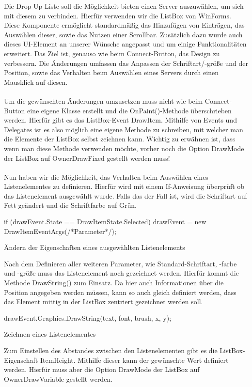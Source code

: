 Die Drop-Up-Liste soll die Möglichkeit bieten einen Server auszuwählen, um sich mit diesem zu verbinden. Hierfür verwenden wir die ListBox von WinForms. Diese Komponente ermöglicht standardmäßig das Hinzufügen von Einträgen, das Auswählen dieser, sowie das Nutzen einer Scrollbar. Zusätzlich dazu wurde auch dieses UI-Element an unserer Wünsche angepasst und um einige Funktionalitäten erweitert. Das Ziel ist, genauso wie beim Connect-Button, das Design zu verbessern. Die Änderungen umfassen das Anpassen der Schriftart/-größe und der Position, sowie das Verhalten beim Auswählen eines Servers durch einen Mausklick auf diesen.
\\ \ \\
Um die gewünschten Änderungen umzusetzen muss nicht wie beim Connect-Button eine eigene Klasse erstellt und die OnPaint()-Methode überschrieben werden. Hierfür gibt es das ListBox-Event DrawItem. Mithilfe von Events und Delegates ist es also möglich eine eigene Methode zu schreiben, mit welcher man die Elemente der ListBox selbst zeichnen kann. Wichtig zu erwähnen ist, dass wenn man diese Methode verwenden möchte, vorher noch die Option DrawMode der ListBox auf OwnerDrawFixed gestellt werden muss!
\\ \ \\
Nun haben wir die Möglichkeit, das Verhalten beim Auswählen eines Listenelementes zu definieren. Hierfür wird mit einem If-Anweisung überprüft ob das Listenelement ausgewählt wurde. Falls das der Fall ist, wird die Schriftart auf Fett geändert und die Schriftfarbe auf Grün.

\begin{program}[H]
\begin{CSharpCode}
if (drawEvent.State == DrawItemState.Selected)
{
    drawEvent = new DrawItemEventArgs(/*Parameter*/);
}
\end{CSharpCode}
\caption{Ändern der Eigenschaften eines ausgewählten Listenelements}
\end{program}
\noindent
Nach dem Definieren aller weiteren Parameter, wie Standard-Schriftart, -farbe und -größe muss das Listenelement noch gezeichnet werden. Hierfür kommt die Methode DrawString() zum Einsatz. Da hier auch Informationen über die Position angegeben werden müssen, kann so auch gleich definiert werden, dass das Element mittig in der ListBox zentriert gezeichnet werden soll.

\begin{program}[H]
\begin{CSharpCode}
drawEvent.Graphics.DrawString(text, font, brush, x, y);
\end{CSharpCode}
\caption{Zeichnen eines Listenelementes}
\end{program}
\noindent
Zum Einstellen des Abstandes zwischen den Listenelementen gibt es die ListBox-Eigenschaft ItemHeight. Mithilfe dieser kann der gewünschte Wert definiert werden. Hierfür muss aber die Option DrawMode der ListBox auf OwnerDrawVariable gestellt werden.

